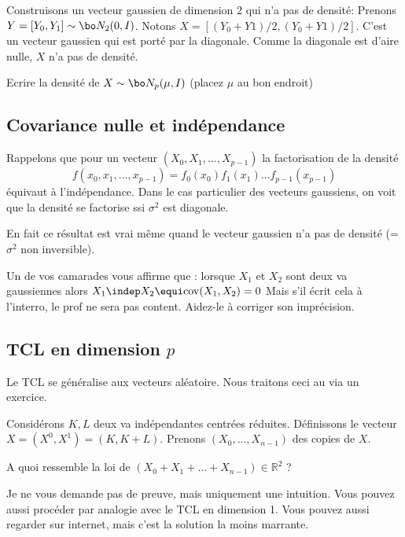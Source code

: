 \documentclass{article}
\begin{document}
Construisons un vecteur gaussien de dimension $2$ qui n'a pas de  densité:  Prenons $Y=[Y_0,Y_1] \sim \bo N_2(0,I)$.  Notons $X= [(Y_0+Y1)/2,(Y_0+Y1)/2  ]$. C'est un vecteur gaussien qui est porté par la diagonale. Comme la diagonale est d'aire nulle, $X$ n'a pas de densité.  
 
 

\begin{exo}
Ecrire la densité de $X\sim  \bo N_p(\mu,I)$ (placez $\mu$ au bon endroit)
\end{exo}





 \subsection{Covariance nulle et indépendance}

Rappelons que pour un vecteur $(X_0,X_1,...,X_{p-1})$ la factorisation de la densité 
$$
f(x_0,x_1,...,x_{p-1}) = f_0(x_0) f_1(x_1)...f_{p-1}(x_{p-1})
$$ 
équivaut à l'indépendance.   Dans le cas particulier des vecteurs gaussiens, on voit que la densité se factorise ssi $\sigma^2$ est diagonale. 

En fait ce résultat est vrai même quand le vecteur gaussien n'a pas de densité (= $\sigma^2$ non inversible). 


 \begin{exo} Un de vos camarades vous affirme que :  lorsque $X_1$ et $X_2$ sont deux va  gaussiennes alors
 $
 X_1\indep X_2 \equi  \mathrm{cov}(X_1,X_2) = 0
 $
Mais s'il écrit cela à l'interro, le prof ne sera pas content. Aidez-le à corriger son imprécision. 
  \end{exo}
 
 
 \subsection{TCL en dimension $p$}
 
Le TCL se généralise aux vecteurs aléatoire. Nous traitons ceci au via un exercice. 
 
 Considérons $K,L$ deux va indépendantes centrées réduites.  Définissons le vecteur $X=(X^0,X^1) = (K, K+L)$.  Prenons $(X_0,...,X_{n-1})$ des copies de $X$.   
 
 A quoi ressemble la loi de   $(X_0+X_1+...+X_{n-1})\in \mathbb R^2$  ? 
 
 Je ne vous demande pas de preuve, mais uniquement une intuition.  Vous pouvez aussi procéder par analogie avec le TCL en dimension 1. Vous pouvez aussi regarder sur internet, mais c'est la solution la moins marrante.  
 
\end{document}
